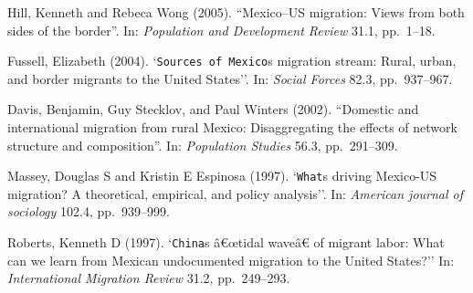 \documentclass[
  12pt,
]{article}
\begin{document}
Hill, Kenneth and Rebeca Wong (2005). ``Mexico--US migration: Views from
both sides of the border''. In: \emph{Population and Development Review}
31.1, pp.~1--18.

Fussell, Elizabeth (2004). `\texttt{Sources\ of\ Mexico}s migration
stream: Rural, urban, and border migrants to the United States''. In:
\emph{Social Forces} 82.3, pp.~937--967.

Davis, Benjamin, Guy Stecklov, and Paul Winters (2002). ``Domestic and
international migration from rural Mexico: Disaggregating the effects of
network structure and composition''. In: \emph{Population Studies} 56.3,
pp.~291--309.

Massey, Douglas S and Kristin E Espinosa (1997). `\texttt{What}s driving
Mexico-US migration? A theoretical, empirical, and policy analysis''.
In: \emph{American journal of sociology} 102.4, pp.~939--999.

Roberts, Kenneth D (1997). `\texttt{China}s â€œtidal waveâ€ of migrant
labor: What can we learn from Mexican undocumented migration to the
United States?'' In: \emph{International Migration Review} 31.2,
pp.~249--293.
\end{document}
